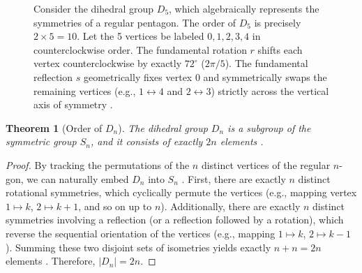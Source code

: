 \documentclass[11pt]{article}
\theoremstyle{definition}
\theoremstyle{plain}
\newtheorem{theorem}{Theorem}[section]
\theoremstyle{remark}
\begin{document}
\begin{figure}[H]
    \caption{Consider the dihedral group $D_5$, which algebraically represents the symmetries of a regular pentagon. The order of $D_5$ is precisely $2 \times 5 = 10$. Let the 5 vertices be labeled $0, 1, 2, 3, 4$ in counterclockwise order. The fundamental rotation $r$ shifts each vertex counterclockwise by exactly $72^\circ$ ($2\pi/5$). The fundamental reflection $s$ geometrically fixes vertex $0$ and symmetrically swaps the remaining vertices (e.g., $1 \leftrightarrow 4$ and $2 \leftrightarrow 3$) strictly across the vertical axis of symmetry \cite{gallian}.}
    \label{fig:D5_5gon}
\end{figure}


\begin{theorem}[Order of $D_n$]
The dihedral group $D_n$ is a subgroup of the symmetric group $S_n$, and it consists of exactly $2n$ elements \cite{dummit}.
\end{theorem}

\begin{proof}
By tracking the permutations of the $n$ distinct vertices of the regular $n$-gon, we can naturally embed $D_n$ into $S_n$ \cite{fraleigh}. 
First, there are exactly $n$ distinct rotational symmetries, which cyclically permute the vertices (e.g., mapping vertex $1 \mapsto k$, $2 \mapsto k+1$, and so on up to $n$). 
Additionally, there are exactly $n$ distinct symmetries involving a reflection (or a reflection followed by a rotation), which reverse the sequential orientation of the vertices (e.g., mapping $1 \mapsto k$, $2 \mapsto k-1$). 
Summing these two disjoint sets of isometries yields exactly $n + n = 2n$ elements \cite{gallian}. Therefore, $|D_n| = 2n$.
\end{proof}
\end{document}
